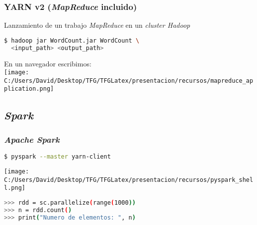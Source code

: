 \documentclass{beamer}
\begin{document}

\begin{frame}[fragile]
\frametitle{YARN v2 (\textit{MapReduce} incluido)}
Lanzamiento de un trabajo \textit{MapReduce} en un \textit{cluster Hadoop}
\begin{lstlisting}[language=bash, numbers=none, frame=single]
$ hadoop jar WordCount.jar WordCount \
  <input_path> <output_path>
\end{lstlisting}
  
En un navegador escribimos: \\
\vfill
\texttt{[image: C:/Users/David/Desktop/TFG/TFGLatex/presentacion/recursos/mapreduce\_application.png]}
  
\end{frame}


\subsection{\textit{Spark}}

\begin{frame}[fragile]
\frametitle{\textit{Apache Spark}}

\begin{block}{}
\begin{lstlisting}[language=bash, numbers=none, frame=single]
$ pyspark --master yarn-client
\end{lstlisting}
\end{block}

\texttt{[image: C:/Users/David/Desktop/TFG/TFGLatex/presentacion/recursos/pyspark\_shell.png]}

\begin{block}{}
\begin{lstlisting}[language=bash, numbers=none, frame=single, showstringspaces=false]
>>> rdd = sc.parallelize(range(1000))
>>> n = rdd.count()
>>> print("Numero de elementos: ", n)
\end{lstlisting}
\end{block}

\end{frame}

\end{document}
